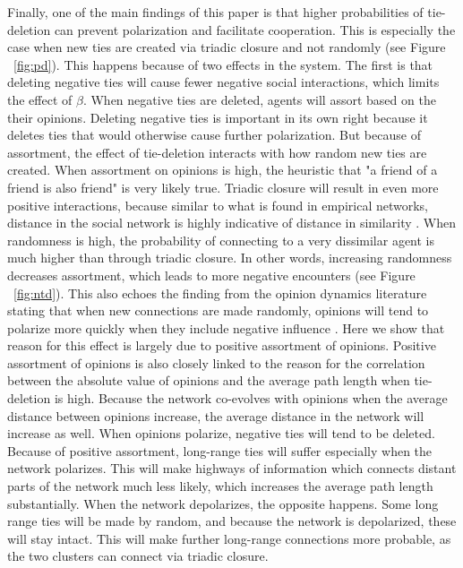 \documentclass{article}
\begin{document}
Finally, one of the main findings of this paper is that higher probabilities of tie-deletion can prevent polarization and facilitate cooperation. This is especially the case when new ties are created via triadic closure and not randomly (see Figure ~\ref{fig:pd}). This happens because of two effects in the system. The first is that deleting negative ties will cause fewer negative social interactions, which limits the effect of $\beta$. When negative ties are deleted, agents will assort based on the their opinions. 
Deleting negative ties is important in its own right because it deletes ties that would otherwise cause further polarization. But because of assortment, the effect of tie-deletion interacts with how random new ties are created. When assortment on opinions is high, the heuristic that "a friend of a friend is also friend" is very likely true. Triadic closure will result in even more positive interactions, because similar to what is found in empirical networks, distance in the social network is highly indicative of distance in similarity \cite{kossinets_origins_2009}. When randomness is high, the probability of connecting to a very dissimilar agent is much higher than through triadic closure. In other words, increasing randomness decreases assortment, which leads to more negative encounters (see Figure ~\ref{fig:ntd}). This also echoes the finding from the opinion dynamics literature stating that when new connections are made randomly, opinions will tend to polarize more quickly when they include negative influence \cite{flache_why_2006,flache_small_2011,turner_paths_2018}. Here we show that reason for this effect is largely due to positive assortment of opinions. 
Positive assortment of opinions is also closely linked to the reason for the correlation between the absolute value of opinions and the average path length when tie-deletion is high. Because the network co-evolves with opinions when the average distance between opinions increase, the average distance in the network will increase as well. When opinions polarize, negative ties will tend to be deleted. Because of positive assortment, long-range ties will suffer especially when the network polarizes. This will make highways of information which connects distant parts of the network much less likely, which increases the average path length substantially. When the network depolarizes, the opposite happens. Some long range ties will be made by random, and because the network is depolarized, these will stay intact. This will make further long-range connections more probable, as the two clusters can connect via triadic closure.
\end{document}
